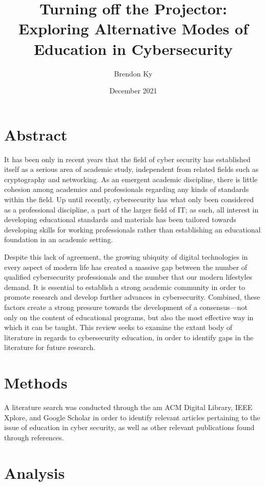 \documentclass{article}
\title{
    Turning off the Projector: \\
    \large Exploring Alternative Modes of Education in Cybersecurity
}
\author{Brendon Ky}
\date{December 2021}
\begin{document}
\maketitle

\section{Abstract}

    It has been only in recent years that the field of cyber security has established itself as a serious area of academic study, independent from related fields such as cryptography and networking. As an emergent academic discipline, there is little cohesion among academics and professionals regarding any kinds of standards within the field. Up until recently, cybersecurity has what only been considered as a professional discipline, a part of the larger field of IT; as such, all interest in developing educational standards and materials has been tailored towards developing skills for working professionals rather than establishing an educational foundation in an academic setting. 

    Despite this lack of agreement, the growing ubiquity of digital technologies in every aspect of modern life has created a massive gap between the number of qualified cybersecurity professionals and the number that our modern lifestyles demand. It is essential to establish a strong academic community in order to promote research and develop further advances in cybersecurity. 
    Combined, these factors create a strong pressure towards the development of a consensus---not only on the content of educational programs, but also the most effective way in which it can be taught. 
    This review seeks to examine the extant body of literature in regards to cybersecurity education, in order to identify gaps in the literature for future research.

\section{Methods}

    A literature search was conducted through the am ACM Digital Library, IEEE Xplore, and Google Scholar in order to identify relevant articles pertaining to the issue of education in cyber security, as well as other relevant publications found through references.

\section{Analysis}
\end{document}
